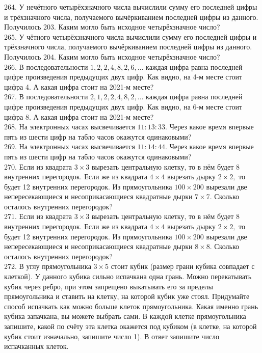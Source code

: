 \documentclass[12pt]{article}
\begin{document}
264. У нечётного четырёхзначного числа вычислили сумму его последней цифры и трёхзначного числа, получаемого вычёркиванием последней цифры из данного. Получилось 203. Каким могло быть исходное четырёхзначное число?\\
265. У чётного четырёхзначного числа вычислили сумму его последней цифры и трёхзначного числа, получаемого вычёркиванием последней цифры из данного. Получилось 204. Каким могло быть исходное четырёхзначное число?\\
266. В последовательности $1, 2, 2, 4, 8, 2, 6, \ldots$ каждая цифра равна последней цифре произведения предыдущих двух цифр. Как видно, на 4-м месте стоит цифра 4. А какая цифра стоит на 2021-м месте?\\
267. В последовательности $2, 1, 2, 2, 4, 8, 2, \ldots$ каждая цифра равна последней цифре произведения предыдущих двух цифр. Как видно, на 6-м месте стоит цифра 8. А какая цифра стоит на 2021-м месте?\\
268. На электронных часах высвечивается $11:13:33.$ Через какое время впервые пять из шести цифр на табло часов окажутся одинаковыми?\\
269. На электронных часах высвечивается $11:14:44.$ Через какое время впервые пять из шести цифр на табло часов окажутся одинаковыми?\\
270. Если из квадрата $3\times3$ вырезать центральную клетку, то в нём будет 8 внутренних перегородок. Если же из квадрата $4\times4$ вырезать дырку $2\times2,$ то будет 12 внутренних перегородок. Из прямоугольника $100\times200$ вырезали две непересекающиеся и несоприкасающиеся квадратные дырки $7\times7.$ Сколько осталось внутренних перегородок?\\
271. Если из квадрата $3\times3$ вырезать центральную клетку, то в нём будет 8 внутренних перегородок. Если же из квадрата $4\times4$ вырезать дырку $2\times2,$ то будет 12 внутренних перегородок. Из прямоугольника $100\times200$ вырезали две непересекающиеся и несоприкасающиеся квадратные дырки $8\times8.$ Сколько осталось внутренних перегородок?\\
272. В углу прямоугольника $3\times5$ стоит кубик (размер грани кубика совпадает с клеткой). У данного кубика сильно испачкана одна грань. Можно перекатывать кубик через ребро, при этом запрещено выкатывать его за пределы прямоугольника и ставить на клетку, на которой кубик уже стоял. Придумайте способ испачкать как можно больше клеток прямоугольника. Какая именно грань кубика запачкана, вы можете выбрать сами. В каждой клетке прямоугольника запишите, какой по счёту эта клетка окажется под кубиком (в клетке, на которой кубик стоит изначально, запишите число 1). В ответ запишите число испачканных клеток.
\end{document}
